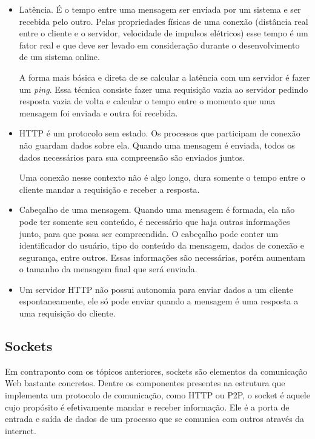 \documentclass[a4paper,12pt]{article}
\begin{document}
\begin{itemize}
    \item Latência. É o tempo entre uma mensagem ser enviada por um sistema e ser recebida pelo outro. Pelas propriedades físicas de uma conexão (distância real entre o cliente e o servidor, velocidade de impulsos elétricos) esse tempo é um fator real e que deve ser levado em consideração durante o desenvolvimento de um sistema online.

    A forma mais básica e direta de se calcular a latência com um servidor é fazer um \emph{ping}. Essa técnica consiste fazer uma requisição vazia ao servidor pedindo resposta vazia de volta e calcular o tempo entre o momento que uma mensagem foi enviada e outra foi recebida.

    \item HTTP é um protocolo sem estado. Os processos que participam de conexão não guardam dados sobre ela. Quando uma mensagem é enviada, todos os dados necessários para sua compreensão são enviados juntos.

    Uma conexão nesse contexto não é algo longo, dura somente o tempo entre o cliente mandar a requisição e receber a resposta.

    \item Cabeçalho de uma mensagem. Quando uma mensagem é formada, ela não pode ter somente seu conteúdo, é necessário que haja outras informações junto, para que possa ser compreendida. O cabeçalho pode conter um identificador do usuário, tipo do conteúdo da mensagem, dados de conexão e segurança, entre outros. Essas informações são necessárias, porém aumentam o tamanho da mensagem final que será enviada.

    \item Um servidor HTTP não possui autonomia para enviar dados a um cliente espontaneamente, ele só pode enviar quando a mensagem é uma resposta a uma requisição do cliente.
\end{itemize}


\subsection{Sockets}

Em contraponto com os tópicos anteriores, sockets são elementos da comunicação Web bastante concretos. Dentre os componentes presentes na estrutura que implementa um protocolo de comunicação, como HTTP ou P2P, o socket é aquele cujo propósito é efetivamente mandar e receber informação. Ele é a porta de entrada e saída de dados de um processo que se comunica com outros através da internet.
\end{document}
